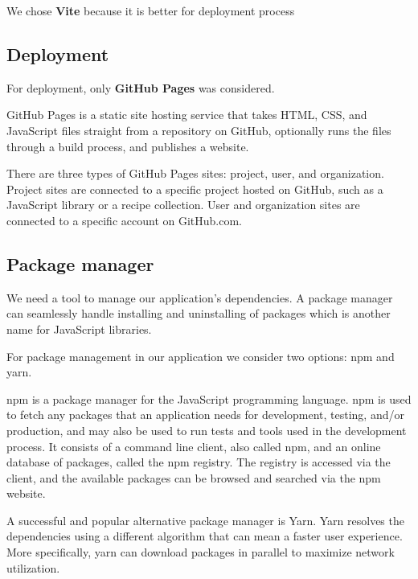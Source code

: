   We chose \textbf{Vite} because it is better for deployment process


\subsection*{Deployment}
  For deployment, only \textbf{GitHub Pages} was considered.

  GitHub Pages is a static site hosting service that takes HTML, CSS, and JavaScript files straight from a repository on GitHub, optionally runs the files through a build process, and publishes a website.

  There are three types of GitHub Pages sites: project, user, and organization. Project sites are connected to a specific project hosted on GitHub, such as a JavaScript library or a recipe collection. User and organization sites are connected to a specific account on GitHub.com.


\subsection*{Package manager}
  We need a tool to manage our application's dependencies.
  A package manager can seamlessly handle installing and uninstalling of packages which is another name for JavaScript libraries.

  For package management in our application we consider two options: npm and yarn.

  npm is a package manager for the JavaScript programming language.
  npm is used to fetch any packages that an application needs for development, testing, and/or production, and may also be used to run tests and tools used in the development process.
  It consists of a command line client, also called npm, and an online database of packages, called the npm registry. 
  The registry is accessed via the client, and the available packages can be browsed and searched via the npm website.

  A successful and popular alternative package manager is Yarn. 
  Yarn resolves the dependencies using a different algorithm that can mean a faster user experience.
  More specifically, yarn can download packages in parallel to maximize network utilization.

